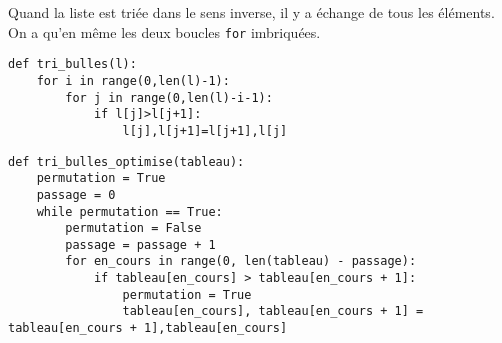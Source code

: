 \ifprof
Quand la liste est triée dans le sens inverse, il y a échange de tous les éléments. On a qu'en même les deux boucles \texttt{for} imbriquées.
\else\fi

\ifprof
\begin{lstlisting}
def tri_bulles(l):
    for i in range(0,len(l)-1):
        for j in range(0,len(l)-i-1):
            if l[j]>l[j+1]:
                l[j],l[j+1]=l[j+1],l[j]
\end{lstlisting}
\else\fi

\ifprof
\begin{lstlisting}
def tri_bulles_optimise(tableau):
    permutation = True
    passage = 0
    while permutation == True:
        permutation = False
        passage = passage + 1
        for en_cours in range(0, len(tableau) - passage):
            if tableau[en_cours] > tableau[en_cours + 1]:
                permutation = True
                tableau[en_cours], tableau[en_cours + 1] = tableau[en_cours + 1],tableau[en_cours]
\end{lstlisting}
\else\fi